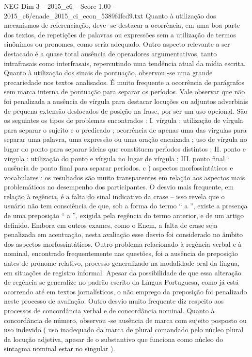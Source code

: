 \begin{textsample}{NEG Dim 3 – 2015\_c6 – Score 1.00 – 2015\_c6/enade\_2015\_ci\_econ\_5389f4fcd9.txt}
Quanto à utilização dos mecanismos de referenciação, deve -se destacar a ocorrência, em uma boa parte dos textos, de repetições de palavras ou expressões sem a utilização de termos sinônimos ou pronomes, como seria adequado.
Outro aspecto relevante a ser destacado é a quase total ausência de operadores argumentativos, tanto intrafrasais como interfrasais, repercutindo uma tendência atual da mídia escrita.
Quanto à utilização dos sinais de pontuação, observou -se uma grande precariedade nos textos analisados.
É muito frequente a ocorrência de parágrafos sem marca interna de pontuação para separar os períodos.
Vale observar que não foi penalizada a ausência de vírgula para destacar locuções ou adjuntos adverbiais de pequena extensão deslocados de posição na frase, por ser um uso opcional.
São os seguintes os tipos de problemas encontrados : I. vírgula : utilização de vírgula para separar o sujeito e o predicado ; ocorrência de apenas uma das vírgulas para separar uma palavra, uma expressão ou uma oração encaixada ; uso de vírgula no lugar do ponto para separar ideias que constituem períodos distintos ; II. ponto e vírgula : utilização do ponto e vírgula no lugar de vírgula ; III. ponto final : ausência de ponto final para separar períodos. c ) aspectos morfossintáticos e vocabulares : os resultados são muito transparentes em relação aos aspectos mais problemáticos no desempenho dos participantes.
O desvio mais frequente, em relação à regência, é a falta do sinal indicativo da crase – isso revela que o usuário não tem consciência de que, sob a forma do termo “ a ”, existe a presença de uma preposição “ a ”, exigida pela regência do termo anterior, e de um artigo definido.
Embora em outros exames, como o Enem, a falta de crase seja penalizada em acentuação, nesta avaliação esse desvio foi considerado no âmbito dos aspectos morfossintáticos.
Outro problema relacionado à regência verbal e à nominal, encontrado frequentemente nas questões, foi a ausência de preposição antes de pronome relativo, processo generalizado na modalidade oral da língua, em situações de registro informal.
Apesar da possibilidade de que essa alteração de regência se generalize no padrão escrito da Língua Portuguesa, como já está ocorrendo até em textos jornalísticos, o não emprego da preposição foi penalizado neste processo de avaliação.
Outro desvio muito frequente diz respeito aos processos de concordância verbal e de concordância nominal.
Quanto à concordância de número, observou -se ausência de marca com sujeito posposto ou uso indevido ( uso inadequado da marca de plural comandado pelo núcleo plural da locução adjetiva, apesar de o substantivo que funciona como núcleo do sintagma nominal estar no singular ).

\end{textsample}
